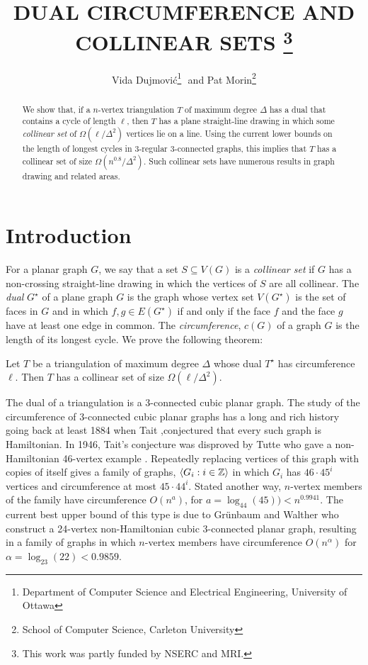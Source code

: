 \documentclass{patmorin}
\title{\MakeUppercase{Dual Circumference and Collinear Sets}%
    \thanks{This work was partly funded by NSERC and MRI.}}
\author{Vida Dujmovi\'c\thanks{Department of Computer Science and Electrical Engineering, University of Ottawa}\,\, and 
        Pat Morin\thanks{School of Computer Science, Carleton University}}
\newcommand{\dual}[1]{{#1}^\star}
\begin{document}
\maketitle


\begin{abstract}
   We show that, if a $n$-vertex triangulation $T$ of maximum degree
   $\Delta$ has a dual that contains a cycle of length $\ell$, then
   $T$ has a plane straight-line drawing in which some \emph{collinear
   set} of $\Omega(\ell/\Delta^2)$ vertices lie on a line.  Using the
   current lower bounds on the length of longest cycles in 3-regular
   3-connected graphs, this implies that $T$ has a collinear set of
   size $\Omega(n^{0.8}/\Delta^2)$.  Such collinear sets have numerous
   results in graph drawing and related areas.
\end{abstract}

\section{Introduction}

For a planar graph $G$, we say that a set $S\subseteq V(G)$ is
a \emph{collinear set} if $G$ has a non-crossing straight-line drawing in
which the vertices of $S$ are all collinear.  The \emph{dual} $\dual{G}$
of a plane graph $G$ is the graph whose vertex set $V(\dual{G})$ is
the set of faces in $G$ and in which $f,g\in E(\dual{G})$ if and only
if the face $f$ and the face $g$ have at least one edge in common.
The \emph{circumference}, $c(G)$ of a graph $G$ is the length of its
longest cycle. We prove the following theorem:

\begin{thm}
  Let $T$ be a triangulation of maximum degree $\Delta$ whose dual
  $\dual{T}$ has circumference $\ell$. Then $T$ has a collinear set of
  size $\Omega(\ell/\Delta^2)$.
\end{thm}

The dual of a triangulation is a 3-connected cubic planar graph.
The study of the circumference of 3-connected cubic planar graphs
has a long and rich history going back at least 1884 when Tait
\cite{tait:listings},conjectured that every such graph is Hamiltonian.  In
1946, Tait's conjecture was disproved by Tutte who gave a non-Hamiltonian
46-vertex example \cite{tutte:on}.  Repeatedly replacing vertices of
this graph with copies of itself gives a family of graphs, $\langle G_i:i\in
\mathbb{Z}\rangle$ in which $G_i$ has $46\cdot 45^i$ vertices and circumference at
most $45\cdot44^i$.  Stated another way, $n$-vertex members of the
family have circumference $O(n^a)$, for $a=\log_{44}(45)) < n^{0.9941}$.
The current best upper bound of this type is due to Gr\"unbaum and
Walther \cite{grunbaum.walther:shortness} who construct a 24-vertex
non-Hamiltonian cubic 3-connected planar graph, resulting in a family
of graphs in which $n$-vertex members have circumference $O(n^{\alpha})$
for $\alpha=\log_{23}(22)< 0.9859$.
\end{document}
